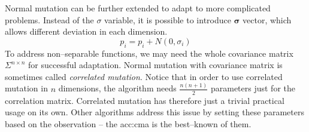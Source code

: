 Normal mutation can be further extended to adapt to more complicated problems. Instead of the $\sigma$ variable, it is possible to introduce $\boldsymbol{\sigma}$ vector, which allows different deviation in each dimension.
$$
p_i = p_i + N(0,\sigma_i)
$$ 
To address non--separable functions, we may need the whole covariance matrix $\Sigma^{n \times n}$ for successful adaptation. Normal mutation with covariance matrix is sometimes called \emph{correlated mutation}. Notice that in order to use correlated mutation in $n$ dimensions, the algorithm needs $\frac{n\left(n+1\right)}{2}$ parameters just for the correlation matrix. Correlated mutation has therefore just a trivial practical usage on its own. Other algorithms address this issue by setting these parameters based on the observation -- the \acrfull{acc:cma} is the best--known of them.

